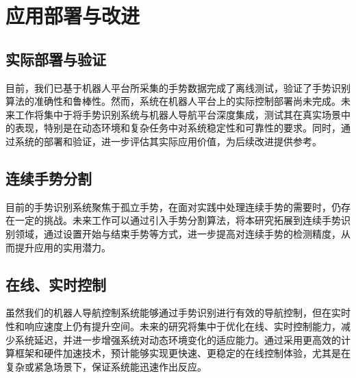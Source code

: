 

\section{应用部署与改进}
\subsection{实际部署与验证}
目前，我们已基于机器人平台所采集的手势数据完成了离线测试，验证了手势识别算法的准确性和鲁棒性。然而，系统在机器人平台上的实际控制部署尚未完成。未来工作将集中于将手势识别系统与机器人导航平台深度集成，测试其在真实场景中的表现，特别是在动态环境和复杂任务中对系统稳定性和可靠性的要求。同时，通过系统的部署和验证，进一步评估其实际应用价值，为后续改进提供参考。
\subsection{连续手势分割}
目前的手势识别系统聚焦于孤立手势，在面对实践中处理连续手势的需要时，仍存在一定的挑战。未来工作可以通过引入手势分割算法，将本研究拓展到连续手势识别领域，通过设置开始与结束手势等方式，进一步提高对连续手势的检测精度，从而提升应用的实用潜力。
\subsection{在线、实时控制}
虽然我们的机器人导航控制系统能够通过手势识别进行有效的导航控制，但在实时性和响应速度上仍有提升空间。未来的研究将集中于优化在线、实时控制能力，减少系统延迟，并进一步增强系统对动态环境变化的适应能力。通过采用更高效的计算框架和硬件加速技术，预计能够实现更快速、更稳定的在线控制体验，尤其是在复杂或紧急场景下，保证系统能迅速作出反应。

